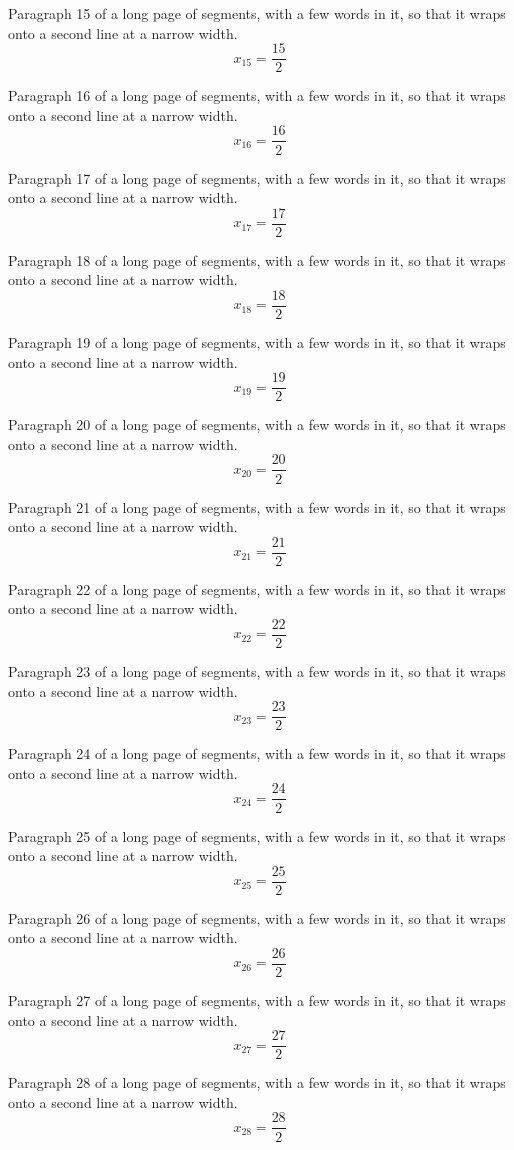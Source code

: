 Paragraph 15 of a long page of segments, with a few words in it, so that it wraps onto a second line at a narrow width.
\[ x_{15} = \frac{15}{2} \]

Paragraph 16 of a long page of segments, with a few words in it, so that it wraps onto a second line at a narrow width.
\[ x_{16} = \frac{16}{2} \]

Paragraph 17 of a long page of segments, with a few words in it, so that it wraps onto a second line at a narrow width.
\[ x_{17} = \frac{17}{2} \]

Paragraph 18 of a long page of segments, with a few words in it, so that it wraps onto a second line at a narrow width.
\[ x_{18} = \frac{18}{2} \]

Paragraph 19 of a long page of segments, with a few words in it, so that it wraps onto a second line at a narrow width.
\[ x_{19} = \frac{19}{2} \]

Paragraph 20 of a long page of segments, with a few words in it, so that it wraps onto a second line at a narrow width.
\[ x_{20} = \frac{20}{2} \]

Paragraph 21 of a long page of segments, with a few words in it, so that it wraps onto a second line at a narrow width.
\[ x_{21} = \frac{21}{2} \]

Paragraph 22 of a long page of segments, with a few words in it, so that it wraps onto a second line at a narrow width.
\[ x_{22} = \frac{22}{2} \]

Paragraph 23 of a long page of segments, with a few words in it, so that it wraps onto a second line at a narrow width.
\[ x_{23} = \frac{23}{2} \]

Paragraph 24 of a long page of segments, with a few words in it, so that it wraps onto a second line at a narrow width.
\[ x_{24} = \frac{24}{2} \]

Paragraph 25 of a long page of segments, with a few words in it, so that it wraps onto a second line at a narrow width.
\[ x_{25} = \frac{25}{2} \]

Paragraph 26 of a long page of segments, with a few words in it, so that it wraps onto a second line at a narrow width.
\[ x_{26} = \frac{26}{2} \]

Paragraph 27 of a long page of segments, with a few words in it, so that it wraps onto a second line at a narrow width.
\[ x_{27} = \frac{27}{2} \]

Paragraph 28 of a long page of segments, with a few words in it, so that it wraps onto a second line at a narrow width.
\[ x_{28} = \frac{28}{2} \]


